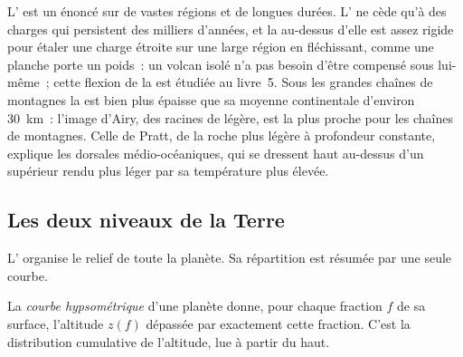 \begin{omfigure}
\par{}
\label{fig:b1:isostasy-gravity:models}
\end{omfigure}

L' est un énoncé sur de vastes régions et de longues durées.
L' ne cède qu'à des charges qui persistent des milliers d'années, et la
 au-dessus d'elle est assez rigide pour étaler une charge étroite sur
une large région en fléchissant, comme une planche porte un poids~: un volcan isolé
n'a pas besoin d'être compensé sous lui-même~; cette flexion de la  est
étudiée au livre~5. Sous les grandes chaînes de montagnes la  est bien plus
épaisse que sa moyenne continentale d'environ \qty{30}{km}~: l'image d'Airy, des
racines de  légère, est la plus proche pour les chaînes de montagnes. Celle de
Pratt, de la roche plus légère à profondeur constante, explique les dorsales
médio-océaniques, qui se dressent haut au-dessus d'un  supérieur rendu plus
léger par sa température plus élevée.

\subsection*{Les deux niveaux de la Terre}

L' organise le relief de toute la planète. Sa répartition est résumée par
une seule courbe.

\begin{definition}\label{def:b1:isostasy-gravity:hypsometry}
La \emph{courbe hypsométrique} d'une planète donne, pour chaque
fraction $f$ de sa surface, l'altitude $z(f)$ dépassée par exactement cette
fraction. C'est la distribution cumulative de l'altitude, lue à partir du haut.
\end{definition}

